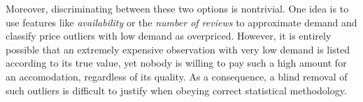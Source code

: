 Moreover, discriminating between these two options is nontrivial.
One idea is to use features like \emph{availability} or the \emph{number of reviews} to approximate demand and classify price outliers with low demand as overpriced.
However, it is entirely possible that an extremely expensive observation with very low demand is listed according to its true value, yet nobody is willing to pay such a high amount for an accomodation, regardless of its quality.
As a consequence, a blind removal of such outliers is difficult to justify when obeying correct statistical methodology.












